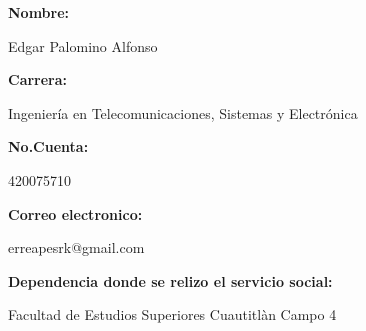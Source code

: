 \documentclass[a4paper,12pt]{article}
\begin{document}
    \begin{titlepage}
        \centering
        \par\vspace{0.5cm}

        \par\vspace{1cm}

        \raggedright{\Large\textbf{Nombre:}}
        \par\vspace{0.5cm}
        \centering
        {\Large{Edgar Palomino Alfonso}}
        \par\vspace{0.5cm}

        \raggedright{\Large\textbf{Carrera:}}
        \par\vspace{0.5cm}
        \centering
        {\Large{Ingeniería en Telecomunicaciones, Sistemas y Electrónica}}
        \par\vspace{0.5cm}

        \raggedright{\Large\textbf{No.Cuenta:}}
        \par\vspace{0.5cm}
        \centering
        {\Large{420075710}}
        \par\vspace{0.5cm}

        \raggedright{\Large\textbf{Correo electronico:}}
        \par\vspace{0.5cm}
        \centering
        {\Large{erreapesrk@gmail.com}}
        \par\vspace{0.5cm}

        \raggedright{\Large\textbf{Dependencia donde se relizo el servicio social:}}
        \par\vspace{0.5cm}
        \centering
        {\Large{Facultad de Estudios Superiores Cuautitlàn Campo 4}}
        \par\vspace{0.5cm}


\end{titlepage}
\end{document}
